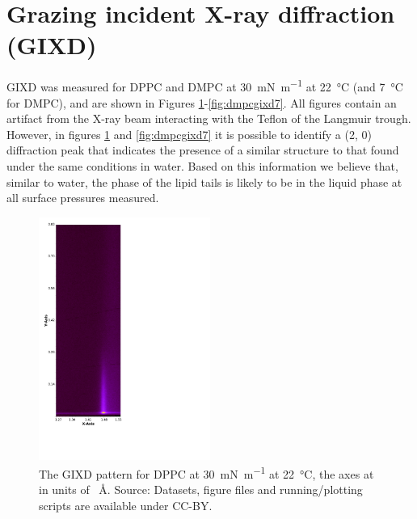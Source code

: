 \documentclass[11pt,a4paper]{article}
\begin{document}
\section{Grazing incident X-ray diffraction (GIXD)}
\label{sec:gixd}
GIXD was measured for DPPC and DMPC at \SI{30}{\milli\newton\per\meter} at \SI{22}{\celsius} (and \SI{7}{\celsius} for DMPC), and are shown in Figures \ref{fig:dppcgixd}-\ref{fig:dmpcgixd7}. All figures contain an artifact from the X-ray beam interacting with the Teflon of the Langmuir trough. However, in figures \ref{fig:dppcgixd} and \ref{fig:dmpcgixd7} it is possible to identify a (2, 0) diffraction peak that indicates the presence of a similar structure to that found under the same conditions in water.\cite{Watkins2009} Based on this information we believe that, similar to water, the phase of the lipid tails is likely to be in the liquid phase at all surface pressures measured.
\begin{figure}[h]
	\centering
	\includegraphics[width=0.50\textwidth]{figures/206041}
	\caption{The GIXD pattern for DPPC at \SI{30}{\milli\newton\per\meter} at \SI{22}{\celsius}, the axes at in units of \si{\per\angstrom}. Source: Datasets, figure files and running/plotting scripts are available under CC-BY.\cite{mccluskey_2018}}
	\label{fig:dppcgixd}
\end{figure}
\end{document}

